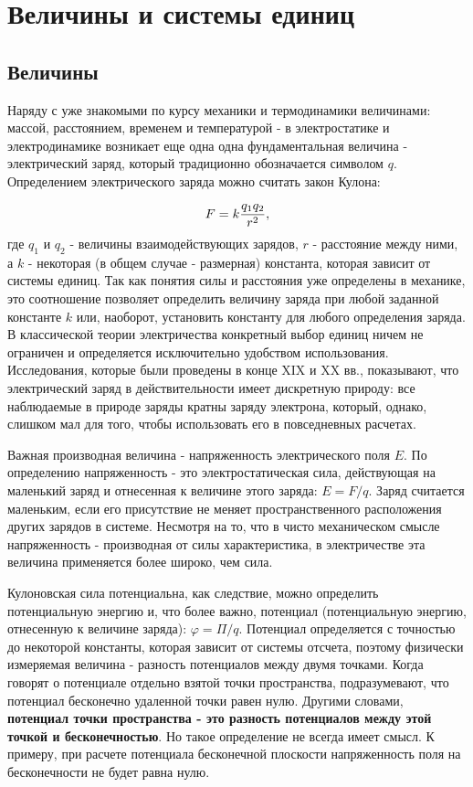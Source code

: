 \section{Величины и системы единиц}

\subsection{Величины}

Наряду с уже знакомыми по курсу механики и термодинамики величинами: массой, расстоянием, временем и температурой - в электростатике и электродинамике возникает еще одна одна фундаментальная величина - электрический заряд, который традиционно обозначается символом $q$. Определением электрического заряда можно считать закон Кулона:

\begin{equation}
	\eqmark
	F = k \frac{q_1 q_2}{r^2},
\end{equation}
где $q_1$ и $q_2$ - величины взаимодействующих зарядов, $r$ - расстояние между ними, а $k$ - некоторая (в общем случае - размерная) константа, которая зависит от системы единиц. Так как понятия силы и расстояния уже определены в механике, это соотношение позволяет определить величину заряда при любой заданной константе $k$ или, наоборот, установить константу для любого определения заряда. В классической теории электричества конкретный выбор единиц ничем не ограничен и определяется исключительно удобством использования. Исследования, которые были проведены в конце XIX и XX вв., показывают, что электрический заряд в действительности имеет дискретную природу: все наблюдаемые в природе заряды кратны заряду электрона, который, однако, слишком мал для того, чтобы использовать его в повседневных расчетах.

Важная производная величина - напряженность электрического поля $E$. По определению напряженность - это электростатическая сила, действующая на маленький заряд и отнесенная к величине этого заряда: $E = F/q$. Заряд считается маленьким, если его присутствие не меняет пространственного расположения других зарядов в системе. Несмотря на то, что в чисто механическом смысле напряженность - производная от силы характеристика, в электричестве эта величина применяется более широко, чем сила.

Кулоновская сила потенциальна, как следствие, можно определить потенциальную энергию и, что более важно, потенциал (потенциальную энергию, отнесенную к величине заряда): $\varphi = \Pi/q$. Потенциал определяется с точностью до некоторой константы, которая зависит от системы отсчета, поэтому физически измеряемая величина - разность потенциалов между двумя точками. Когда говорят о потенциале отдельно взятой точки пространства, подразумевают, что потенциал бесконечно удаленной точки равен нулю. Другими словами, \textbf{потенциал точки пространства - это разность потенциалов между этой точкой и бесконечностью}. Но такое определение не всегда имеет смысл. К примеру, при расчете потенциала бесконечной плоскости напряженность поля на бесконечности не будет равна нулю.

